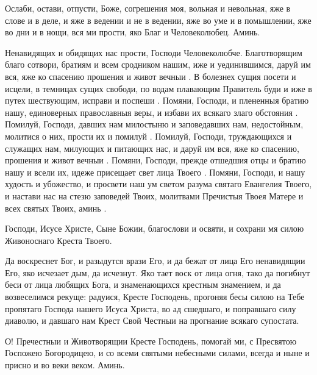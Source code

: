 \begin{mymulticols}


Ослаби, остави, отпусти, Боже, согрешения моя, вольная и невольная, яже в слове и в деле, и яже в ведении и не в ведении, яже во уме и в помышлении, яже во дни и в нощи, вся ми прости, яко Благ и Человеколюбец. Аминь. 




Ненавидящих и обидящих нас прости, Господи Человеколюбче. Благотворящим благо сотвори, братиям и всем сродником нашим, иже и уединившимся, даруй им вся, яже ко спасению прошения и живот вечныи . В болезнех сущия посети и исцели, в темницах сущих свободи, по водам плавающим Правитель буди и иже в путех шествующим, исправи и поспеши . Помяни, Господи, и плененныя братию нашу, единоверных православныя веры, и избави их всякаго злаго обстояния . Помилуй, Господи, давших нам милостыню и заповедавших нам, недостойным, молитися о них, прости их и помилуй . Помилуй, Господи, труждающихся и служащих нам, милующих и питающих нас, и даруй им вся, яже ко спасению, прошения и живот вечныи . Помяни, Господи, прежде отшедшия отцы и братию нашу и всели их, идеже присещает свет лица Твоего . Помяни, Господи, и нашу худость и убожество, и просвети наш ум светом разума святаго Евангелия Твоего, и настави нас на стезю заповедей Твоих, молитвами Пречистыя Твоея Матере и всех святых Твоих, аминь .




 Господи, Исусе Христе, Сыне Божии, благослови и освяти, и сохрани мя силою Живоноснаго Креста Твоего. 






Да воскреснет Бог, и разыдутся врази Его, и да бежат от лица Его ненавидящии Его, яко исчезает дым, да исчезнут. Яко тает воск от лица огня, тако да погибнут беси от лица любящих Бога, и знаменающихся крестным знамением, и да возвеселимся рекуще: радуися, Кресте Господень, прогоняя бесы силою на Тебе пропятаго Господа нашего Исуса Христа, во ад сшедшаго, и поправшаго силу диаволю, и давшаго нам Крест Свой Честныи на прогнание всякаго супостата.


О! Пречестныи и Животворящии Кресте Господень, помогай ми, с Пресвятою Госпожею Богородицею, и со всеми святыми небесными силами, всегда и ныне и присно и во веки веком. Аминь.


\end{mymulticols}

